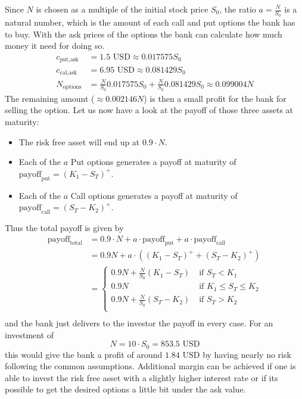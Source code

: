 \documentclass[11pt,oneside,a4paper]{article}
\begin{document}
	Since $ N $ is chosen as a multiple of the initial stock price $ S_0 $, the ratio $ a = \frac{N}{S_0} $ is a natural number, which is the amount of each call and put options the bank has to buy.
	With the ask prices of the options the bank can calculate how much money it need for doing so. 
	\begin{align*}
	c_{\text{put,ask}} &= 1.5 \text{ USD} \approx 0.017575 S_0 \\
	c_{\text{cal,ask}} &= 6.95 \text{ USD} \approx 0.081429 S_0  \\
	N_{\text{options}} &= \frac{N}{S_0} 0.017575 S_0 + \frac{N}{S_0} 0.081429 S_0 \approx 0.099004 N
	\end{align*}
	The remaining amount ($ \approx 0.002146 N $) is then a small profit for the bank for selling the option. Let us now have a look at the payoff of those three assets at maturity:
	\begin{itemize}
		\item The risk free asset will end up at $ 0.9\cdot N $.
		\item Each of the $ a $ Put options generates a payoff at maturity of $ \text{payoff}_{\text{put}} = (K_1-S_T)^{+} $.
		\item Each of the $ a $ Call options generates a payoff at maturity of $ \text{payoff}_{\text{call}} = (S_T- K_2)^{+} $.
	\end{itemize}
	Thus the total payoff is given by
	\begin{align*}
		\text{payoff}_{\text{total}} &= 0.9\cdot	N + a \cdot \text{payoff}_{\text{put}} + a \cdot \text{payoff}_{\text{call}} \\ &= 0.9N + a\cdot((K_1-S_T)^+ + (S_T- K_2)^+) \\
		&=
		\begin{cases}
				0.9N + \frac{N}{S_0}(K_1 - S_T) \; &\text{if } S_T < K_1 \\
				0.9N  \; &\text{if } K_1 \leq S_T \leq K_2 \\
				0.9N + \frac{N}{S_0}(S_T-K_2) \; &\text{if }S_T > K_2 \\
		\end{cases} \\
	\end{align*}
	and the bank just delivers to the investor the payoff in every case. 
	For an investment of \[N = 10\cdot S_0 = 853.5 \text{ USD} \] this would give the bank a profit of around $ 1.84 \text{ USD} $ by having nearly no risk following the common assumptions. Additional margin can be achieved if one is able to invest the risk free asset with a slightly higher interest rate or if its possible to get the desired options a little bit under the ask value.
	\newpage
\end{document}
